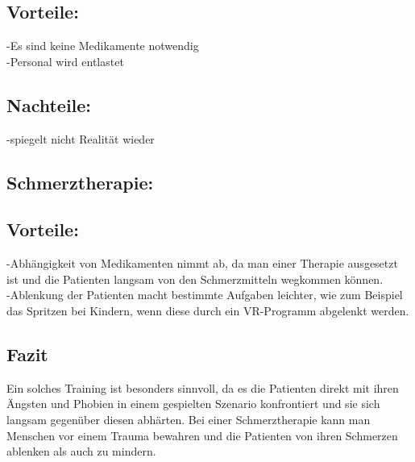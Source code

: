 \subsection{Vorteile:}
-Es sind keine Medikamente notwendig\\
-Personal wird entlastet\\
\subsection{Nachteile:}
-spiegelt nicht Realität wieder\\

\subsection{Schmerztherapie:}
\subsection{Vorteile:}
-Abhängigkeit von Medikamenten nimmt ab, da man einer Therapie ausgesetzt ist und die Patienten langsam von den Schmerzmitteln wegkommen können.\\
-Ablenkung der Patienten macht bestimmte Aufgaben leichter, wie zum Beispiel das Spritzen bei Kindern, wenn diese durch ein VR-Programm abgelenkt werden.\\

\subsection{Fazit}
Ein solches Training ist besonders sinnvoll, da es die Patienten direkt mit ihren Ängsten und Phobien in einem gespielten Szenario konfrontiert und sie sich langsam gegenüber diesen abhärten. Bei einer Schmerztherapie kann man Menschen vor einem Trauma bewahren und die Patienten von ihren Schmerzen ablenken als auch zu mindern.





